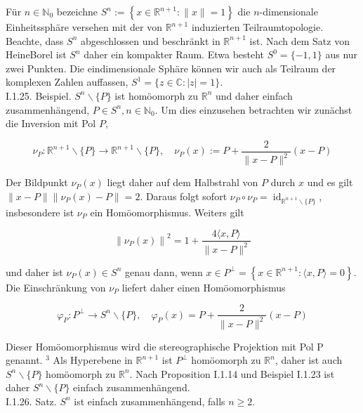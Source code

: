 \documentclass[10pt]{article}
\begin{document}
Für $n \in \mathbb{N}_{0}$ bezeichne $S^{n}:=\left\{x \in \mathbb{R}^{n+1}:\|x\|=1\right\}$ die $n$-dimensionale Einheitssphäre versehen mit der von $\mathbb{R}^{n+1}$ induzierten Teilraumtopologie. Beachte, dass $S^{n}$ abgeschlossen und beschränkt in $\mathbb{R}^{n+1}$ ist. Nach dem Satz von HeineBorel ist $S^{n}$ daher ein kompakter Raum. Etwa besteht $S^{0}=\{-1,1\}$ aus nur zwei Punkten. Die eindimensionale Sphäre können wir auch als Teilraum der komplexen Zahlen auffassen, $S^{1}=\{z \in \mathbb{C}:|z|=1\}$.\\
I.1.25. Beispiel. $S^{n} \backslash\{P\}$ ist homöomorph zu $\mathbb{R}^{n}$ und daher einfach zusammenhängend, $P \in S^{n}, n \in \mathbb{N}_{0}$. Um dies einzusehen betrachten wir zunächst die Inversion mit Pol $P$,

$$
\nu_{P}: \mathbb{R}^{n+1} \backslash\{P\} \rightarrow \mathbb{R}^{n+1} \backslash\{P\}, \quad \nu_{P}(x):=P+\frac{2}{\|x-P\|^{2}}(x-P)
$$

Der Bildpunkt $\nu_{P}(x)$ liegt daher auf dem Halbstrahl von $P$ durch $x$ und es gilt $\|x-P\|\left\|\nu_{P}(x)-P\right\|=2$. Daraus folgt sofort $\nu_{P} \circ \nu_{P}=\operatorname{id}_{\mathbb{R}^{n+1} \backslash\{P\}}$, insbesondere ist $\nu_{P}$ ein Homöomorphismus. Weiters gilt

$$
\left\|\nu_{P}(x)\right\|^{2}=1+\frac{4\langle x, P\rangle}{\|x-P\|^{2}}
$$

und daher ist $\nu_{P}(x) \in S^{n}$ genau dann, wenn $x \in P^{\perp}=\left\{x \in \mathbb{R}^{n+1}:\langle x, P\rangle=0\right\}$. Die Einschränkung von $\nu_{P}$ liefert daher einen Homöomorphismus

$$
\varphi_{P}: P^{\perp} \rightarrow S^{n} \backslash\{P\}, \quad \varphi_{P}(x)=P+\frac{2}{\|x-P\|^{2}}(x-P)
$$

Dieser Homöomorphismus wird die stereographische Projektion mit Pol P genannt. ${ }^{3}$ Als Hyperebene in $\mathbb{R}^{n+1}$ ist $P^{\perp}$ homöomorph zu $\mathbb{R}^{n}$, daher ist auch $S^{n} \backslash\{P\}$ homöomorph zu $\mathbb{R}^{n}$. Nach Proposition I.1.14 und Beispiel I.1.23 ist daher $S^{n} \backslash\{P\}$ einfach zusammenhängend.\\
I.1.26. Satz. $S^{n}$ ist einfach zusammenhängend, falls $n \geq 2$.
\end{document}
